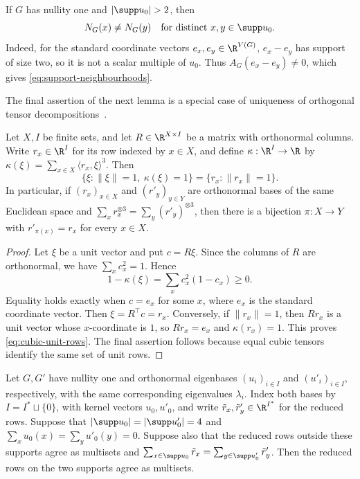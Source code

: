 If $G$ has nullity one and $|\supp u_0|>2$, then
\begin{equation}\label{eq:support-neighbourhoods}
 N_G(x)\ne N_G(y)\quad\text{for distinct }x,y\in\supp u_0.
\end{equation}
Indeed, for the standard coordinate vectors $e_x,e_y\in\R^{V(G)}$,
$e_x-e_y$ has support of size two, so it is not a scalar multiple of
$u_0$. Thus $A_G(e_x-e_y)\ne0$, which gives
\cref{eq:support-neighbourhoods}.

The final assertion of the next lemma is a special case of uniqueness of
orthogonal tensor decompositions~\cite[Theorem~3.2]{ZhangGolub2001}.
\begin{lemma}\label{lem:odeco}
 Let $X,I$ be finite sets, and let $R\in\R^{X\times I}$ be a matrix
 with orthonormal columns. Write $r_x\in\R^I$ for its row indexed by
 $x\in X$, and define $\kappa:\R^I\to\R$ by
 $\kappa(\xi)=\sum_{x\in X}\langle r_x,\xi\rangle^3$.
 Then
 \begin{equation}\label{eq:cubic-unit-rows}
  \{\xi:\lVert \xi\rVert=1,\ \kappa(\xi)=1\}
  =\{r_x:\lVert r_x\rVert=1\}.
 \end{equation}
 In particular, if $(r_x)_{x\in X}$ and $(r'_y)_{y\in Y}$ are
 orthonormal bases of the same Euclidean space and
 $\sum_x r_x^{\otimes3}=\sum_y(r'_y)^{\otimes3}$, then there is a
 bijection $\pi:X\to Y$ with $r'_{\pi(x)}=r_x$ for every $x\in X$.
\end{lemma}
\begin{proof}
 Let $\xi$ be a unit vector and put $c=R\xi$.
 Since the columns of $R$ are orthonormal, we have $\sum_xc_x^2=1$. Hence
 \begin{equation}\label{eq:cubic-unit-defect}
  1-\kappa(\xi)=\sum_x c_x^2(1-c_x)\geq0.
 \end{equation}
 Equality holds exactly when $c=e_x$ for some $x$,
 where $e_x$ is the standard coordinate vector.
 Then $\xi=R^{\top}c=r_x$.
 Conversely, if $\lVert r_x\rVert=1$, then $Rr_x$ is a unit vector
 whose $x$-coordinate is $1$, so $Rr_x=e_x$ and
 $\kappa(r_x)=1$. This proves \cref{eq:cubic-unit-rows}.
 The final assertion follows because equal cubic tensors identify the
 same set of unit rows.
\end{proof}
\begin{lemma}\label{lem:four-vertex-reconstruction}
Let $G,G'$ have nullity one and orthonormal eigenbases
$(u_i)_{i\in I}$ and $(u'_i)_{i\in I}$, respectively, with the same
corresponding eigenvalues $\lambda_i$.
Index both bases by $I=I^*\sqcup\{0\}$, with kernel vectors $u_0,u'_0$,
and write $\tilde{r}_x,\tilde{r}'_y\in\R^{I^*}$ for the reduced rows.
Suppose that $|\supp u_0|=|\supp u'_0|=4$ and
$\sum_xu_0(x)=\sum_yu'_0(y)=0$.
Suppose also that the reduced rows outside these supports agree as multisets and
$\sum_{x\in\supp u_0}\tilde{r}_x=\sum_{y\in\supp u'_0}\tilde{r}'_y$.
Then the reduced rows on the two supports agree as multisets.
\end{lemma}
